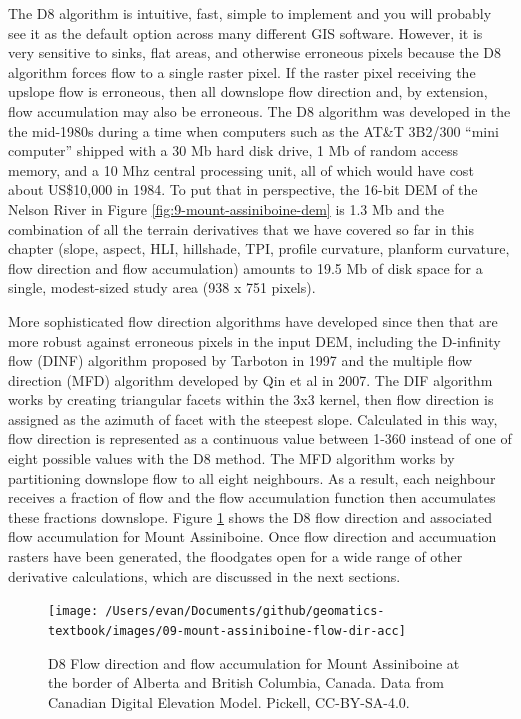 \documentclass[
]{book}
\begin{document}
The D8 algorithm is intuitive, fast, simple to implement and you will probably see it as the default option across many different GIS software. However, it is very sensitive to sinks, flat areas, and otherwise erroneous pixels because the D8 algorithm forces flow to a single raster pixel. If the raster pixel receiving the upslope flow is erroneous, then all downslope flow direction and, by extension, flow accumulation may also be erroneous. The D8 algorithm was developed in the the mid-1980s during a time when computers such as the AT\&T 3B2/300 ``mini computer'' shipped with a 30 Mb hard disk drive, 1 Mb of random access memory, and a 10 Mhz central processing unit, all of which would have cost about US\$10,000 in 1984. To put that in perspective, the 16-bit DEM of the Nelson River in Figure \ref{fig:9-mount-assiniboine-dem} is 1.3 Mb and the combination of all the terrain derivatives that we have covered so far in this chapter (slope, aspect, HLI, hillshade, TPI, profile curvature, planform curvature, flow direction and flow accumulation) amounts to 19.5 Mb of disk space for a single, modest-sized study area (938 x 751 pixels).

More sophisticated flow direction algorithms have developed since then that are more robust against erroneous pixels in the input DEM, including the D-infinity flow (DINF) algorithm proposed by Tarboton in 1997 and the multiple flow direction (MFD) algorithm developed by Qin et al in 2007. The DIF algorithm works by creating triangular facets within the 3x3 kernel, then flow direction is assigned as the azimuth of facet with the steepest slope. Calculated in this way, flow direction is represented as a continuous value between 1-360 instead of one of eight possible values with the D8 method. The MFD algorithm works by partitioning downslope flow to all eight neighbours. As a result, each neighbour receives a fraction of flow and the flow accumulation function then accumulates these fractions downslope. Figure \ref{fig:9-mount-assiniboine-flow-dir-acc} shows the D8 flow direction and associated flow accumulation for Mount Assiniboine. Once flow direction and accumuation rasters have been generated, the floodgates open for a wide range of other derivative calculations, which are discussed in the next sections.

\begin{figure}
\texttt{[image: /Users/evan/Documents/github/geomatics-textbook/images/09-mount-assiniboine-flow-dir-acc]} \caption{D8 Flow direction and flow accumulation for Mount Assiniboine at the border of Alberta and British Columbia, Canada. Data from Canadian Digital Elevation Model. Pickell, CC-BY-SA-4.0.}\label{fig:9-mount-assiniboine-flow-dir-acc}
\end{figure}
\end{document}
